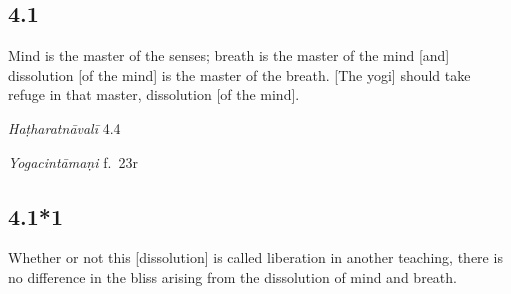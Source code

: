 \begin{ekdosis}
\subsection*{4.1}
\begin{translation}[hp04_001]
Mind is the master of the senses; breath is the master of the mind [and] dissolution [of the mind] is the master of the breath. [The yogi] should take refuge in that master, dissolution [of the mind].
\end{translation}


\begin{testimonia}[hp04_001]
\emph{Haṭharatnāvalī} 4.4
\begin{versinnote}
\end{versinnote}

\emph{Yogacintāmaṇi} f.~23r
\begin{versinnote}
\end{versinnote}

\end{testimonia}

%

\subsection*{4.1*1}
\begin{translation}[hp04_001_1]
Whether or not this [dissolution] is called liberation  in another teaching, there is no difference in the bliss arising from the dissolution of mind and breath.
\end{translation}


\end{ekdosis}
